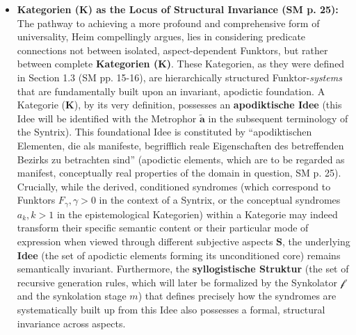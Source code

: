 \documentclass[12pt]{article}
\newcommand{\q}[1]{\enquote{#1}}
\newcommand{\kategorie}{\bm{K}}
\newcommand{\metrophor}{\bm{\widetilde{a}}}
\newcommand{\synkolator}{\mathcal{f}}
\newcommand{\synkolationsstufe}{m}
\newcommand{\syndrom}{F}
\newcommand{\conceptualsyndrome}{a}
\begin{document}
\begin{itemize}
    \item \textbf{Kategorien (\(\kategorie\)) as the Locus of Structural Invariance (SM p. 25):}
    The pathway to achieving a more profound and comprehensive form of universality, Heim compellingly argues, lies in considering predicate connections not between isolated, aspect-dependent Funktors, but rather between complete \textbf{Kategorien (\(\kategorie\))}. These Kategorien, as they were defined in Section 1.3 (SM pp. 15-16), are hierarchically structured Funktor-\textit{systems} that are fundamentally built upon an invariant, apodictic foundation. A Kategorie (\(\kategorie\)), by its very definition, possesses an \textbf{apodiktische Idee} (this Idee will be identified with the Metrophor \( \metrophor \) in the subsequent terminology of the Syntrix). This foundational Idee is constituted by \q{apodiktischen Elementen, die als manifeste, begrifflich reale Eigenschaften des betreffenden Bezirks zu betrachten sind} (apodictic elements, which are to be regarded as manifest, conceptually real properties of the domain in question, SM p. 25).
    Crucially, while the derived, conditioned syndromes (which correspond to Funktors \( \syndrom_\gamma, \gamma > 0 \) in the context of a Syntrix, or the conceptual syndromes \( \conceptualsyndrome_k, k>1 \) in the epistemological Kategorien) within a Kategorie may indeed transform their specific semantic content or their particular mode of expression when viewed through different subjective aspects \( \mathbf{S} \), the underlying \textbf{Idee} (the set of apodictic elements forming its unconditioned core) remains semantically invariant. Furthermore, the \textbf{syllogistische Struktur} (the set of recursive generation rules, which will later be formalized by the Synkolator \( \synkolator \) and the synkolation stage \( \synkolationsstufe \)) that defines precisely how the syndromes are systematically built up from this Idee also possesses a formal, structural invariance across aspects.


\end{itemize}
\end{document}
